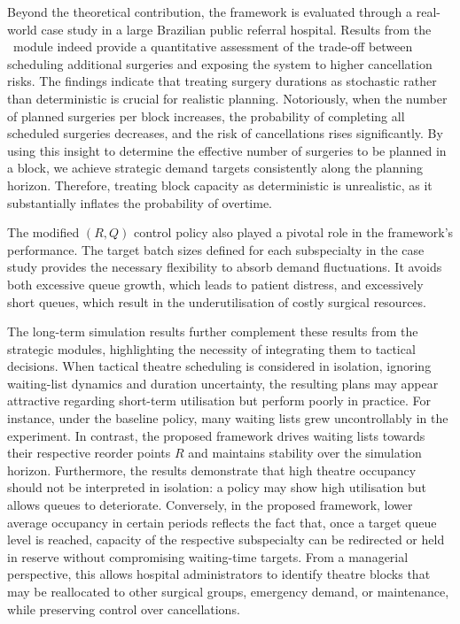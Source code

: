 Beyond the theoretical contribution, the framework is evaluated through a real-world case study in a large Brazilian public referral hospital. 
Results from the \overtimemodule~module indeed provide a quantitative assessment of the trade-off between scheduling additional surgeries and exposing the system to higher cancellation risks. 
The findings indicate that treating surgery durations as stochastic rather than deterministic is crucial for realistic planning. 
Notoriously, when the number of planned surgeries per block increases, the probability of completing all scheduled surgeries decreases, and the risk of cancellations rises significantly.
By using this insight to determine the effective number of surgeries to be planned in a block, we achieve strategic demand targets consistently along the planning horizon.
Therefore, treating block capacity as deterministic is unrealistic, as it substantially inflates the probability of overtime.

The modified $(R,Q)$ control policy also played a pivotal role in the framework's performance. 
The target batch sizes defined for each subspecialty in the case study provides the necessary flexibility to absorb demand fluctuations.
It avoids both excessive queue growth, which leads to patient distress, and excessively short queues, which result in the underutilisation of costly surgical resources.

The long-term simulation results further complement these results from the strategic modules, highlighting the necessity of integrating them to tactical decisions. 
When tactical theatre scheduling is considered in isolation, ignoring waiting-list dynamics and duration uncertainty, the resulting plans may appear attractive regarding short-term utilisation but perform poorly in practice. 
For instance, under the baseline policy, many waiting lists grew uncontrollably in the experiment. 
In contrast, the proposed framework drives waiting lists towards their respective reorder points $R$ and maintains stability over the simulation horizon. 
Furthermore, the results demonstrate that high theatre occupancy should not be interpreted in isolation: a policy may show high utilisation but allows queues to deteriorate. 
Conversely, in the proposed framework, lower average occupancy in certain periods reflects the fact that, once a target queue level is reached, capacity of the respective subspecialty can be redirected or held in reserve without compromising waiting-time targets. 
From a managerial perspective, this allows hospital administrators to identify theatre blocks that may be reallocated to other surgical groups, emergency demand, or maintenance, while preserving control over cancellations.

